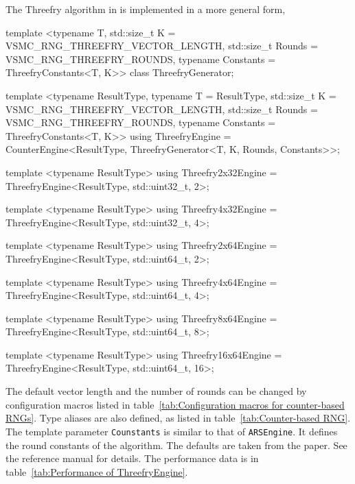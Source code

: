 The Threefry algorithm in \textcite{Salmon:2011um} is implemented in a more
general form,
\begin{cppcode}
  template <typename T, std::size_t K = VSMC_RNG_THREEFRY_VECTOR_LENGTH,
      std::size_t Rounds = VSMC_RNG_THREEFRY_ROUNDS,
      typename Constants = ThreefryConstants<T, K>>
  class ThreefryGenerator;

  template <typename ResultType, typename T = ResultType,
      std::size_t K = VSMC_RNG_THREEFRY_VECTOR_LENGTH,
      std::size_t Rounds = VSMC_RNG_THREEFRY_ROUNDS,
      typename Constants = ThreefryConstants<T, K>>
  using ThreefryEngine =
      CounterEngine<ResultType, ThreefryGenerator<T, K, Rounds, Constants>>;

  template <typename ResultType>
  using Threefry2x32Engine = ThreefryEngine<ResultType, std::uint32_t, 2>;

  template <typename ResultType>
  using Threefry4x32Engine = ThreefryEngine<ResultType, std::uint32_t, 4>;

  template <typename ResultType>
  using Threefry2x64Engine = ThreefryEngine<ResultType, std::uint64_t, 2>;

  template <typename ResultType>
  using Threefry4x64Engine = ThreefryEngine<ResultType, std::uint64_t, 4>;

  template <typename ResultType>
  using Threefry8x64Engine = ThreefryEngine<ResultType, std::uint64_t, 8>;

  template <typename ResultType>
  using Threefry16x64Engine = ThreefryEngine<ResultType, std::uint64_t, 16>;
\end{cppcode}
The default vector length and the number of rounds can be changed by
configuration macros listed in table~\ref{tab:Configuration macros for
  counter-based RNGs}. Type aliases are also defined, as listed in
table~\ref{tab:Counter-based RNG}. The template parameter \verb|Counstants| is
similar to that of \verb|ARSEngine|. It defines the round constants of the
algorithm. The defaults are taken from the paper. See the reference manual for
details. The performance data is in table~\ref{tab:Performance of
  ThreefryEngine}.

